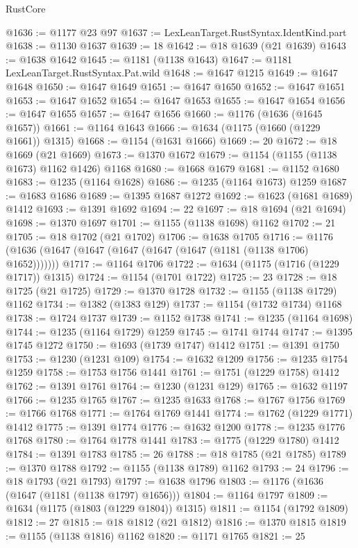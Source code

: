 \begin{lexlean}{RustCore}
\begin{coremodule}
@1636 := @1177 @23 @97
@1637 := LexLeanTarget.RustSyntax.IdentKind.part
@1638 := @1130 @1637
@1639 := 18
@1642 := @18 @1639 (@21 @1639)
@1643 := @1638 @1642
@1645 := @1181 (@1138 @1643)
@1647 := @1181 LexLeanTarget.RustSyntax.Pat.wild
@1648 := @1647 @1215
@1649 := @1647 @1648
@1650 := @1647 @1649
@1651 := @1647 @1650
@1652 := @1647 @1651
@1653 := @1647 @1652
@1654 := @1647 @1653
@1655 := @1647 @1654
@1656 := @1647 @1655
@1657 := @1647 @1656
@1660 := @1176 (@1636 (@1645 @1657))
@1661 := @1164 @1643
@1666 := @1634 (@1175 (@1660 (@1229 @1661)) @1315)
@1668 := @1154 (@1631 @1666)
@1669 := 20
@1672 := @18 @1669 (@21 @1669)
@1673 := @1370 @1672
@1679 := @1154 (@1155 (@1138 @1673) @1162 @1426) @1168
@1680 := @1668 @1679
@1681 := @1152 @1680
@1683 := @1235 (@1164 @1628)
@1686 := @1235 (@1164 @1673) @1259
@1687 := @1683 @1686
@1689 := @1395 @1687 @1272
@1692 := @1623 (@1681 @1689) @1412
@1693 := @1391 @1692
@1694 := 22
@1697 := @18 @1694 (@21 @1694)
@1698 := @1370 @1697
@1701 := @1155 (@1138 @1698) @1162
@1702 := 21
@1705 := @18 @1702 (@21 @1702)
@1706 := @1638 @1705
@1716 := @1176 (@1636 (@1647 (@1647 (@1647 (@1647 (@1647 (@1181 (@1138 @1706) @1652)))))))
@1717 := @1164 @1706
@1722 := @1634 (@1175 (@1716 (@1229 @1717)) @1315)
@1724 := @1154 (@1701 @1722)
@1725 := 23
@1728 := @18 @1725 (@21 @1725)
@1729 := @1370 @1728
@1732 := @1155 (@1138 @1729) @1162
@1734 := @1382 (@1383 @129)
@1737 := @1154 (@1732 @1734) @1168
@1738 := @1724 @1737
@1739 := @1152 @1738
@1741 := @1235 (@1164 @1698)
@1744 := @1235 (@1164 @1729) @1259
@1745 := @1741 @1744
@1747 := @1395 @1745 @1272
@1750 := @1693 (@1739 @1747) @1412
@1751 := @1391 @1750
@1753 := @1230 (@1231 @109)
@1754 := @1632 @1209
@1756 := @1235 @1754 @1259
@1758 := @1753 @1756 @1441
@1761 := @1751 (@1229 @1758) @1412
@1762 := @1391 @1761
@1764 := @1230 (@1231 @129)
@1765 := @1632 @1197
@1766 := @1235 @1765
@1767 := @1235 @1633
@1768 := @1767 @1756
@1769 := @1766 @1768
@1771 := @1764 @1769 @1441
@1774 := @1762 (@1229 @1771) @1412
@1775 := @1391 @1774
@1776 := @1632 @1200
@1778 := @1235 @1776 @1768
@1780 := @1764 @1778 @1441
@1783 := @1775 (@1229 @1780) @1412
@1784 := @1391 @1783
@1785 := 26
@1788 := @18 @1785 (@21 @1785)
@1789 := @1370 @1788
@1792 := @1155 (@1138 @1789) @1162
@1793 := 24
@1796 := @18 @1793 (@21 @1793)
@1797 := @1638 @1796
@1803 := @1176 (@1636 (@1647 (@1181 (@1138 @1797) @1656)))
@1804 := @1164 @1797
@1809 := @1634 (@1175 (@1803 (@1229 @1804)) @1315)
@1811 := @1154 (@1792 @1809)
@1812 := 27
@1815 := @18 @1812 (@21 @1812)
@1816 := @1370 @1815
@1819 := @1155 (@1138 @1816) @1162
@1820 := @1171 @1765
@1821 := 25

\end{coremodule}
\end{lexlean}
